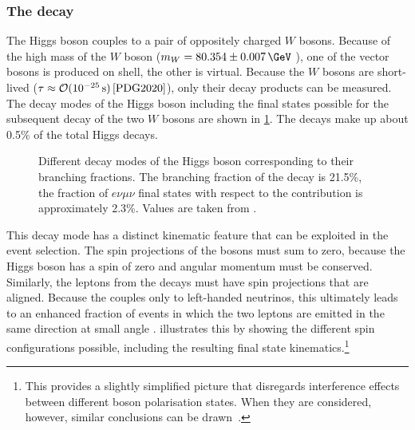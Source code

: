 \subsubsection{The \HWWdet decay}
The Higgs boson couples to a pair of oppositely charged $W$ bosons.
Because of the high mass of the $W$ boson ($m_W = 80.354 \pm 0.007\,\GeV$ \cite{PDG2020}), one of the vector bosons is produced on shell, the other is virtual.
Because the $W$ bosons are short-lived ($\tau \approx \mathcal{O}(10^{-25}\,\text{s})\,\text{\cite{PDG2020}}$), only their decay products can be measured. 
The decay modes of the Higgs boson including the final states possible for the subsequent decay of the two $W$ bosons are shown in \cref{fig:h-branching-ratios}. 
The \HWWdet decays make up about 0.5\% of the total Higgs decays.
\begin{figure}
    \caption{Different decay modes of the Higgs boson corresponding to their branching fractions. The branching fraction of the \HWW decay is 21.5\%, the fraction of $e\nu\mu\nu$ final states with respect to the \HWW contribution is approximately 2.3\%. Values are taken from .}
    \label{fig:h-branching-ratios}
\end{figure}
This decay mode has a distinct kinematic feature that can be exploited in the event selection.
The spin projections of the \Wboson bosons must sum to zero, because the Higgs boson has a spin of zero and angular momentum must be conserved.
Similarly, the leptons from the \Wboson decays must have spin projections that are aligned. Because the \Wboson couples only to left-handed neutrinos, this ultimately leads to an enhanced fraction of \HWWdet events in which the two leptons are emitted in the same direction at small angle \dphill.
 illustrates this by showing the different spin configurations possible, including the resulting final state kinematics.\footnote{This provides a slightly simplified picture that disregards interference effects between different \Wboson boson polarisation states. When they are considered, however, similar conclusions can be drawn~\cite{Maina_2021}.}
